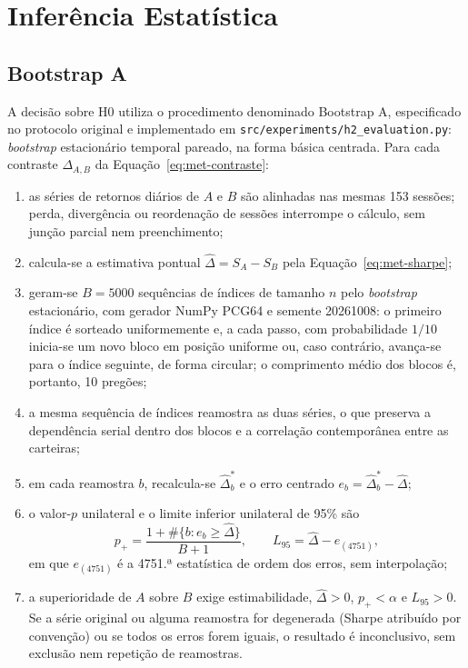 \section{Inferência Estatística}
\label{sec:met-inferencia}

\subsection{Bootstrap A}

A decisão sobre H0 utiliza o procedimento denominado Bootstrap A, especificado no protocolo original e implementado em \texttt{src/experiments/h2\_evaluation.py}: \textit{bootstrap} estacionário temporal pareado, na forma básica centrada. Para cada contraste $\Delta_{A,B}$ da Equação~\eqref{eq:met-contraste}:

\begin{enumerate}
    \item as séries de retornos diários de $A$ e $B$ são alinhadas nas mesmas 153 sessões; perda, divergência ou reordenação de sessões interrompe o cálculo, sem junção parcial nem preenchimento;
    \item calcula-se a estimativa pontual $\hat{\Delta} = S_A - S_B$ pela Equação~\eqref{eq:met-sharpe};
    \item geram-se $B = 5000$ sequências de índices de tamanho $n$ pelo \textit{bootstrap} estacionário, com gerador NumPy PCG64 e semente 20261008: o primeiro índice é sorteado uniformemente e, a cada passo, com probabilidade $1/10$ inicia-se um novo bloco em posição uniforme ou, caso contrário, avança-se para o índice seguinte, de forma circular; o comprimento médio dos blocos é, portanto, 10 pregões;
    \item a mesma sequência de índices reamostra as duas séries, o que preserva a dependência serial dentro dos blocos e a correlação contemporânea entre as carteiras;
    \item em cada reamostra $b$, recalcula-se $\hat{\Delta}^{*}_{b}$ e o erro centrado $e_b = \hat{\Delta}^{*}_{b} - \hat{\Delta}$;
    \item o valor-$p$ unilateral e o limite inferior unilateral de 95\% são
    \begin{equation}
    p_{+} = \frac{1 + \#\{b : e_b \geq \hat{\Delta}\}}{B + 1}, \qquad L_{95} = \hat{\Delta} - e_{(4751)},
    \label{eq:met-bootstrap}
    \end{equation}
    em que $e_{(4751)}$ é a 4751.ª estatística de ordem dos erros, sem interpolação;
    \item a superioridade de $A$ sobre $B$ exige estimabilidade, $\hat{\Delta} > 0$, $p_{+} < \alpha$ e $L_{95} > 0$. Se a série original ou alguma reamostra for degenerada (Sharpe atribuído por convenção) ou se todos os erros forem iguais, o resultado é inconclusivo, sem exclusão nem repetição de reamostras.
\end{enumerate}

